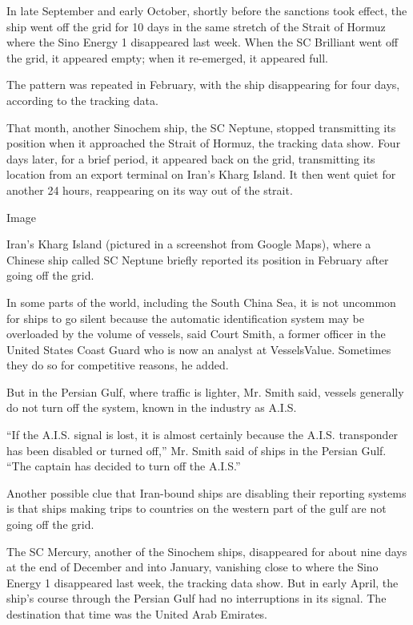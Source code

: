 In late September and early October, shortly before the sanctions took
effect, the ship went off the grid for 10 days in the same stretch of
the Strait of Hormuz where the Sino Energy 1 disappeared last week. When
the SC Brilliant went off the grid, it appeared empty; when it
re-emerged, it appeared full.

The pattern was repeated in February, with the ship disappearing for
four days, according to the tracking data.

That month, another Sinochem ship, the SC Neptune, stopped transmitting
its position when it approached the Strait of Hormuz, the tracking data
show. Four days later, for a brief period, it appeared back on the grid,
transmitting its location from an export terminal on Iran's Kharg
Island. It then went quiet for another 24 hours, reappearing on its way
out of the strait.

Image

Iran's Kharg Island (pictured in a screenshot from Google Maps), where a
Chinese ship called SC Neptune briefly reported its position in February
after going off the grid.

In some parts of the world, including the South China Sea, it is not
uncommon for ships to go silent because the automatic identification
system may be overloaded by the volume of vessels, said Court Smith, a
former officer in the United States Coast Guard who is now an analyst at
VesselsValue. Sometimes they do so for competitive reasons, he added.

But in the Persian Gulf, where traffic is lighter, Mr. Smith said,
vessels generally do not turn off the system, known in the industry as
A.I.S.

``If the A.I.S. signal is lost, it is almost certainly because the
A.I.S. transponder has been disabled or turned off,'' Mr. Smith said of
ships in the Persian Gulf. ``The captain has decided to turn off the
A.I.S.''

Another possible clue that Iran-bound ships are disabling their
reporting systems is that ships making trips to countries on the western
part of the gulf are not going off the grid.

The SC Mercury, another of the Sinochem ships, disappeared for about
nine days at the end of December and into January, vanishing close to
where the Sino Energy 1 disappeared last week, the tracking data show.
But in early April, the ship's course through the Persian Gulf had no
interruptions in its signal. The destination that time was the United
Arab Emirates.

